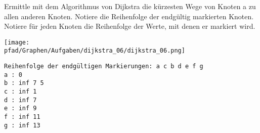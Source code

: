 ﻿\question[4]
Ermittle mit dem Algorithmus von Dijkstra die kürzesten Wege von Knoten a zu allen anderen
Knoten.  Notiere die Reihenfolge der endgültig markierten Knoten.
Notiere für jeden Knoten die Reihenfolge der Werte, mit denen er markiert wird.

\texttt{[image: \\pfad/Graphen/Aufgaben/dijkstra\_06/dijkstra\_06.png]}
\begin{solutionbox}{5cm}
\begin{lstlisting}
Reihenfolge der endgültigen Markierungen: a c b d e f g
a : 0
b : inf 7 5
c : inf 1
d : inf 7
e : inf 9
f : inf 11
g : inf 13
\end{lstlisting}
\end{solutionbox}
